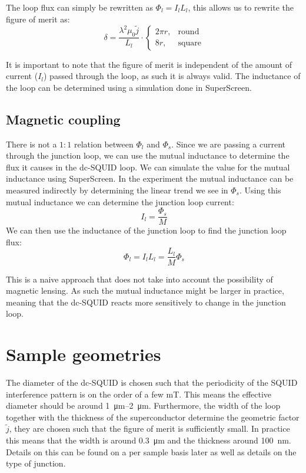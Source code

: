 The loop flux can simply be rewritten as $\Phi_l = I_lL_l$, this allows us to rewrite the figure of merit as:
\begin{equation}
	\delta = \frac{\lambda^2\mu_0\tilde{j}}{L_l} \cdot \begin{cases}
		2\pi r, &\text{round} \\
		8r, &\text{square}
	\end{cases}
	\label{eqn:figure-of-merit}
\end{equation}

It is important to note that the figure of merit is independent of the amount of current ($I_l$) passed through the loop, as such it is always valid. The inductance of the loop can be determined using a simulation done in SuperScreen\cite{bishop-vanhornSuperScreenOpensourcePackage2022}.

\subsection{Magnetic coupling}
\label{sec:magnetic-coupling}
There is not a $1:1$ relation between $\Phi_l$ and $\Phi_s$. Since we are passing a current through the junction loop, we can use the mutual inductance to determine the flux it causes in the dc-SQUID loop. We can simulate the value for the mutual inductance using SuperScreen\cite{bishop-vanhornSuperScreenOpensourcePackage2022}. In the experiment the mutual inductance can be measured indirectly by determining the linear trend we see in $\Phi_s$. Using this mutual inductance we can determine the junction loop current:
\begin{equation}
	I_l = \frac{\Phi_s}{M}
\end{equation}
We can then use the inductance of the junction loop to find the junction loop flux:
\begin{equation}
	\Phi_l = I_lL_l = \frac{L_l}{M}\Phi_s
\end{equation}

This is a naive approach that does not take into account the possibility of magnetic lensing\cite{prigozhin3DSimulationSuperconducting2018}. As such the mutual inductance might be larger in practice, meaning that the dc-SQUID reacts more sensitively to change in the junction loop.

\section{Sample geometries}
The diameter of the dc-SQUID is chosen such that the periodicity of the SQUID interference pattern is on the order of a few \unit{\milli\tesla}. This means the effective diameter should be around \qtyrange{1}{2}{\micro\meter}. Furthermore, the width of the loop together with the thickness of the superconductor determine the geometric factor $\tilde{j}$, they are chosen such that the figure of merit is sufficiently small. In practice this means that the width is around \qty{0.3}{\micro\meter} and the thickness around \qty{100}{\nano\meter}. Details on this can be found on a per sample basis later as well as details on the type of junction.


